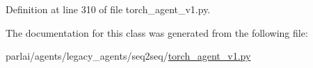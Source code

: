 Definition at line 310 of file torch\+\_\+agent\+\_\+v1.\+py.



The documentation for this class was generated from the following file\+:\begin{DoxyCompactItemize}
\item 
parlai/agents/legacy\+\_\+agents/seq2seq/\hyperlink{torch__agent__v1_8py}{torch\+\_\+agent\+\_\+v1.\+py}\end{DoxyCompactItemize}
